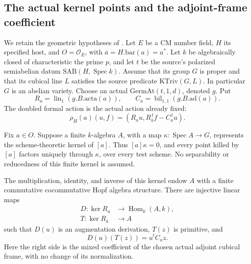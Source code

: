 \subsection{The actual kernel points and the adjoint-frame coefficient}
\label{subsec:faithful-geometric-kernel-count}

We retain the geometric hypotheses of
.  Let \(E\) be a CM number
field, \(H\) its specified host, and \(O=\mathcal O_E\), with
\(\bar a=H.\mathrm{bar}(a)=a^*\).  Let \(k\) be algebraically closed
of characteristic the prime \(p\), and let \(t\) be the source's
polarized semiabelian datum \(\mathrm{SAB}(H,\operatorname{Spec}k)\).
Assume that its group \(G\) is proper and that its cubical line \(L\)
satisfies the source predicate \(\mathrm{KTriv}(G,L)\).
In particular \(G\) is an abelian variety.  Choose an actual
\(\mathrm{GermAt}(t,1,d)\), denoted \(g\).  Put
\[
 R_a=\operatorname{lin}_1(g.B.\mathrm{acta}(a)),\qquad
 C_a=\operatorname{bil}_{1,1}(g.B.\mathrm{ad}(a)).
\]
The doubled formal action is the actual action already fixed:
\[
 \rho_H(a)(u,f)=(R_a u,R_{\bar a}^{\,t}f-C_a^{\,t}u).
 \tag{KG1}\label{eq:faithful-kernel-doubled-action}
\]

Fix \(a\in O\).  Suppose a finite \(k\)-algebra \(A\), with a map
\(\kappa:\operatorname{Spec}A\to G\), represents the scheme-theoretic
kernel of \([a]\).  Thus \([a]\kappa=0\), and every point killed by
\([a]\) factors uniquely through \(\kappa\), over every test scheme.
No separability or reducedness of this finite kernel is assumed.

\begin{srlemma}
\label{lem:faithful-geometric-kernel-pair}
The multiplication, identity, and inverse of this kernel endow \(A\)
with a finite commutative cocommutative Hopf algebra structure.
There are injective linear maps
\[
 \begin{split}
 D:\ker R_a&\longrightarrow\operatorname{Hom}_k(A,k),\\
 T:\ker R_{\bar a}&\longrightarrow A
 \end{split}
\]
such that \(D(u)\) is an augmentation derivation, \(T(z)\) is
primitive, and
\[
                 D(u)(T(z))=u^tC_a z .
 \tag{KG2}\label{eq:faithful-actual-mixed-kernel-pair}
\]
Here the right side is the mixed coefficient of the chosen actual
adjoint cubical frame, with no change of its normalization.
\end{srlemma}

